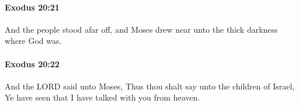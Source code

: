 		\paragraph{Exodus 20:21} %
			\label{EXODUS-20-21}

			And the people stood afar off, and Moses drew near unto the thick darkness where God was.


		\paragraph{Exodus 20:22} %
			\label{EXODUS-20-22}

			And the LORD said unto Moses, Thus thou shalt say unto the children of Israel, Ye have seen that I have talked with you from heaven.


